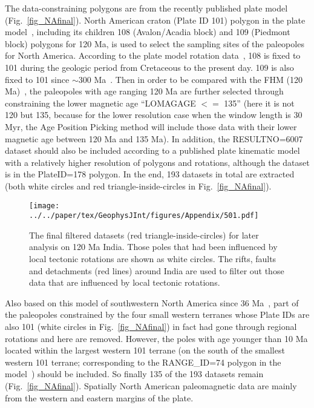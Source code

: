 The data-constraining polygons are from the recently published plate
model~\citep{Y18} (Fig.~\ref{fig_NAfinal}). North American craton (Plate ID 101)
polygon in the plate model~\citep{Y18}, including its children 108
(Avalon/Acadia block) and 109 (Piedmont block) polygons for 120 Ma,
is used to select the sampling sites of the paleopoles for North America.
According to the plate model rotation data~\citep{Y18}, 108 is fixed to 101
during the geologic period from Cretaceous to the present day. 109 is also fixed
to 101 since ${\sim}300$ Ma~\citep{C14}. Then in order to be compared with the
FHM (120 Ma)~\citep{M93,M99}, the paleopoles with age ranging
120 Ma are further selected through constraining the lower magnetic
age ``LOMAGAGE $<=$ 135'' (here it is not 120 but 135, because for the lower
resolution case when the window length is 30 Myr, the Age Position Picking
method will include those data with their lower magnetic age between 120 Ma and
135 Ma). In addition, the RESULTNO=6007 dataset should also be included
according to a published plate kinematic model~\citep{Mc06}
with a relatively higher resolution of polygons and
rotations, although the dataset is in the PlateID=178 polygon. In the end, 193
datasets in total are extracted (both white circles and red
triangle-inside-circles in Fig.~\ref{fig_NAfinal}).

\begin{figure}[!ht]
  \texttt{[image: ../../paper/tex/GeophysJInt/figures/Appendix/501.pdf]}
  \caption[Final filtered datasets for analysis on 120 Ma India]{The
    final filtered datasets (red triangle-inside-circles) for later analysis on
    120 Ma India. Those poles that had been influenced by local
    tectonic rotations are shown as white circles. The rifts, faults and
    detachments (red lines) around India are used to filter out those data that
    are influenced by local tectonic rotations.}\label{fig_INfinal}
\end{figure}

Also based on this model of southwestern North America since 36 Ma~\citep{Mc06},
part of the paleopoles constrained by the four small western terranes whose
Plate IDs are also 101 (white circles in Fig.~\ref{fig_NAfinal}) in fact had gone through regional
rotations and here are removed. However, the poles with age younger than 10 Ma
located within the largest western 101 terrane (on the south of the smallest
western 101 terrane; corresponding to the RANGE\_ID=74 polygon in the
model~\citep{Mc06}) should be included. So finally 135 of the 193 datasets remain
(Fig.~\ref{fig_NAfinal}). Spatially North American paleomagnetic data are mainly
from the western and eastern margins of the plate.

